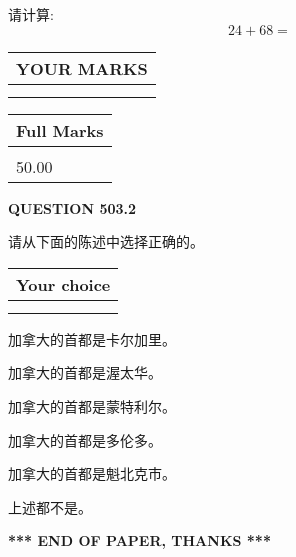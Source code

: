 \documentclass{ctexart}
\begin{document}
  
 
请计算:
\begin{equation}
24 +  %
68 = \nonumber
\end{equation}
 

 

 
  
\vspace{0.2in}
  
\noindent\begin{tabular}{|l|}
\hline
 YOUR MARKS  \\
\hline
 \\ 
 \\ 
\hline
\end{tabular}
\hspace{0.05in} \begin{tabular}{|l|}
\hline
 Full Marks  \\
\hline
 \\ 
50.00 \\
\hline
\end{tabular}
{\textbf{\Large{QUESTION
503.2 
}}}
  
  
请从下面的陈述中选择正确的。
  
  
\noindent\hspace{3.0in} \begin{tabular}{|l|}
\hline
Your choice \\
\hline
 \\ 
 \\ 
\hline
\end{tabular}
  
  
 
 
加拿大的首都是卡尔加里。
 
 
加拿大的首都是渥太华。
 
 
加拿大的首都是蒙特利尔。
 
 
加拿大的首都是多伦多。
 
 
加拿大的首都是魁北克市。
 
 
 上述都不是。
 
 
   
   
 \vspace{0.2in}
 
   
   
   
   
\vspace{1.0in} 
{\textbf{\large{ *** END OF PAPER, THANKS *** }}} 
   
\end{document}
